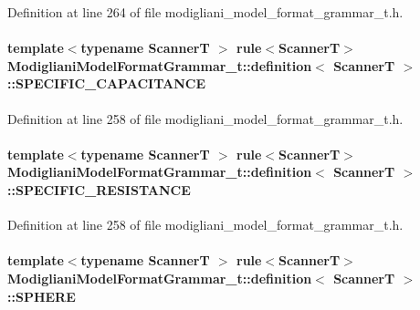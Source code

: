 Definition at line 264 of file modigliani\_\-model\_\-format\_\-grammar\_\-t.h.

\paragraph[{SPECIFIC\_\-CAPACITANCE}]{\setlength{\rightskip}{0pt plus 5cm}template$<$typename ScannerT $>$ rule$<$ScannerT$>$ {\bf ModiglianiModelFormatGrammar\_\-t::definition}$<$ ScannerT $>$::{\bf SPECIFIC\_\-CAPACITANCE}}\hfill\label{struct_modigliani_model_format_grammar__t_1_1definition_aa01a6e3874fb2b6c046130a259f8ad19}


Definition at line 258 of file modigliani\_\-model\_\-format\_\-grammar\_\-t.h.

\paragraph[{SPECIFIC\_\-RESISTANCE}]{\setlength{\rightskip}{0pt plus 5cm}template$<$typename ScannerT $>$ rule$<$ScannerT$>$ {\bf ModiglianiModelFormatGrammar\_\-t::definition}$<$ ScannerT $>$::{\bf SPECIFIC\_\-RESISTANCE}}\hfill\label{struct_modigliani_model_format_grammar__t_1_1definition_ad16cbaabc60421aa3711161c35b2ff4d}


Definition at line 258 of file modigliani\_\-model\_\-format\_\-grammar\_\-t.h.

\paragraph[{SPHERE}]{\setlength{\rightskip}{0pt plus 5cm}template$<$typename ScannerT $>$ rule$<$ScannerT$>$ {\bf ModiglianiModelFormatGrammar\_\-t::definition}$<$ ScannerT $>$::{\bf SPHERE}}\hfill\label{struct_modigliani_model_format_grammar__t_1_1definition_a557e22a3240eea1ec8a4eaa00fd5ecfa}


